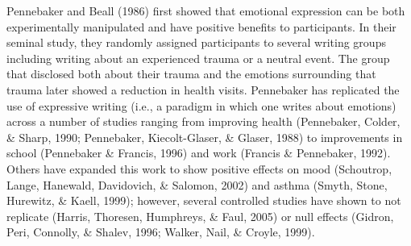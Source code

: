 \documentclass[english,man]{apa6}
\theoremstyle{definition}
\theoremstyle{definition}
\theoremstyle{definition}
\theoremstyle{remark}
\begin{document}
Pennebaker and Beall (1986) first showed that emotional expression can
be both experimentally manipulated and have positive benefits to
participants. In their seminal study, they randomly assigned
participants to several writing groups including writing about an
experienced trauma or a neutral event. The group that disclosed both
about their trauma and the emotions surrounding that trauma later showed
a reduction in health visits. Pennebaker has replicated the use of
expressive writing (i.e., a paradigm in which one writes about emotions)
across a number of studies ranging from improving health (Pennebaker,
Colder, \& Sharp, 1990; Pennebaker, Kiecolt-Glaser, \& Glaser, 1988) to
improvements in school (Pennebaker \& Francis, 1996) and work (Francis
\& Pennebaker, 1992). Others have expanded this work to show positive
effects on mood (Schoutrop, Lange, Hanewald, Davidovich, \& Salomon,
2002) and asthma (Smyth, Stone, Hurewitz, \& Kaell, 1999); however,
several controlled studies have shown to not replicate (Harris,
Thoresen, Humphreys, \& Faul, 2005) or null effects (Gidron, Peri,
Connolly, \& Shalev, 1996; Walker, Nail, \& Croyle, 1999).
\end{document}
